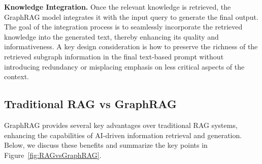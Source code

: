 \documentclass[lettersize,journal]{IEEEtran}
\begin{document}
\noindent\textbf{Knowledge Integration.} Once the relevant knowledge is retrieved, the GraphRAG model integrates it with the input query to generate the final output. The goal of the integration process is to seamlessly incorporate the retrieved knowledge into the generated text, thereby enhancing its quality and informativeness. A key design consideration is how to preserve the richness of the retrieved subgraph information in the final text-based prompt without introducing redundancy or misplacing emphasis on less critical aspects of the context.



\subsection{Traditional RAG vs GraphRAG}
GraphRAG provides several key advantages over traditional RAG systems, enhancing the capabilities of AI-driven information retrieval and generation. Below, we discuss these benefits and summarize the key points in Figure~\ref{fig:RAGvsGraphRAG}.
\end{document}
